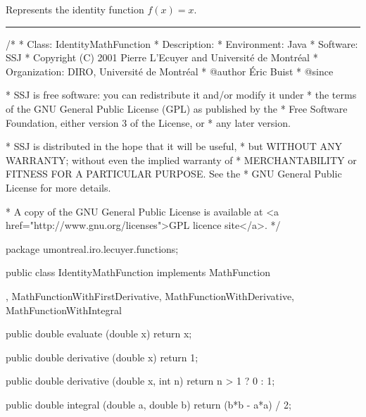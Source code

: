 
Represents the identity function $f(x)=x$.

\bigskip\hrule

\begin{code}
\begin{hide}
/*
 * Class:        IdentityMathFunction
 * Description:  
 * Environment:  Java
 * Software:     SSJ 
 * Copyright (C) 2001  Pierre L'Ecuyer and Université de Montréal
 * Organization: DIRO, Université de Montréal
 * @author       Éric Buist
 * @since

 * SSJ is free software: you can redistribute it and/or modify it under
 * the terms of the GNU General Public License (GPL) as published by the
 * Free Software Foundation, either version 3 of the License, or
 * any later version.

 * SSJ is distributed in the hope that it will be useful,
 * but WITHOUT ANY WARRANTY; without even the implied warranty of
 * MERCHANTABILITY or FITNESS FOR A PARTICULAR PURPOSE.  See the
 * GNU General Public License for more details.

 * A copy of the GNU General Public License is available at
   <a href="http://www.gnu.org/licenses">GPL licence site</a>.
 */
\end{hide}
package umontreal.iro.lecuyer.functions;\begin{hide}

\end{hide}

public class IdentityMathFunction implements MathFunction\begin{hide}

,
      MathFunctionWithFirstDerivative, MathFunctionWithDerivative,
      MathFunctionWithIntegral {
   public double evaluate (double x) {
      return x;
   }
   
   public double derivative (double x) {
      return 1;
   }

   public double derivative (double x, int n) {
      return n > 1 ? 0 : 1;
   }

   public double integral (double a, double b) {
      return (b*b - a*a) / 2;
   }
}\end{hide}
\end{code}
